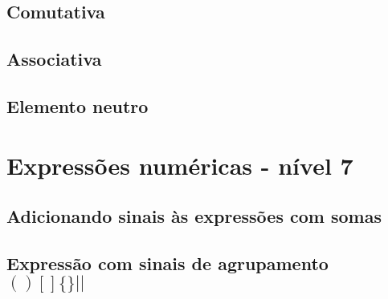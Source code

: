 \subsection{Comutativa}

\subsection{Associativa}

\subsection{Elemento neutro}

\section{Expressões numéricas - nível 7}

\subsection{Adicionando sinais às expressões com somas}

\subsection{Expressão com sinais de agrupamento $ ( ) [ ] \{ \} | | $}
